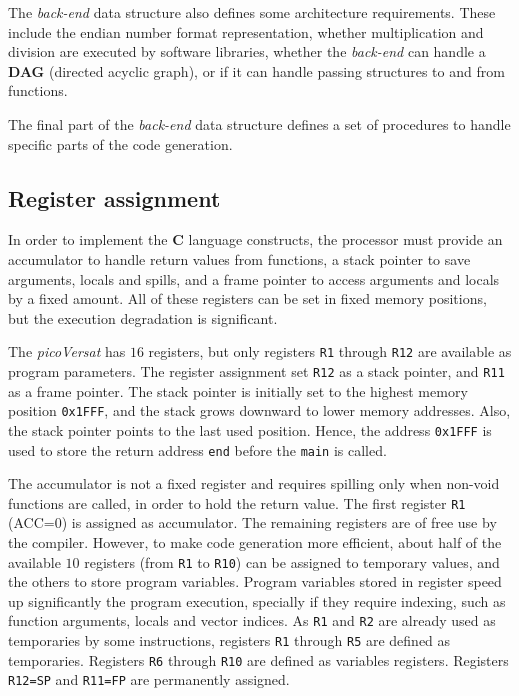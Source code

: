 \documentclass[journal]{IEEEtran}
\begin{document}
The {\it back-end} data structure also defines some
architecture requirements.
These include the endian number format representation,
whether multiplication and division are executed
by software libraries,
whether the {\it back-end} can handle a {\bf DAG}
(directed acyclic graph), or if
it can handle passing structures to and from
functions.

The final part of the {\it back-end} data structure
defines a set of procedures to handle
specific parts of the code generation.

\subsection{Register assignment}

In order to implement the {\bf C} language constructs,
the processor must provide an accumulator to handle
return values from functions, a stack pointer to save
arguments, locals and spills, and a frame pointer to
access arguments and locals by a fixed amount.
All of these registers can be set in fixed memory positions,
but the execution degradation is significant.

The {\it picoVersat} has $16$ registers, but only registers
{\tt R1} through {\tt R12} are available as program
parameters.
The register assignment set {\tt R12} as a stack pointer, and
{\tt R11} as a frame pointer.
The stack pointer is initially set to the highest memory position
{\tt 0x1FFF}, and the stack grows downward to lower memory addresses.
Also, the stack pointer points to the last used position.
Hence, the address {\tt 0x1FFF} is used to store the
return address {\tt end} before the {\tt main} is called.

The accumulator is not a fixed register and requires spilling
only when non-void functions are called, in order to hold the
return value.
The first register {\tt R1} ({\sc ACC=0}) is assigned as accumulator.
The remaining registers are of free use by the compiler.
However, to make code generation more efficient, about half of the
available $10$ registers (from {\tt R1} to {\tt R10}) can be assigned
to temporary values, and the others to store program variables.
Program variables stored in register speed up significantly the
program execution, specially if they require indexing, such as
function arguments, locals and vector indices.
As {\tt R1} and {\tt R2} are already used as temporaries by some
instructions, registers {\tt R1} through {\tt R5} are defined as
temporaries.
Registers {\tt R6} through {\tt R10} are defined as variables
registers.
Registers {\tt R12=SP} and {\tt R11=FP} are permanently assigned.
\end{document}
